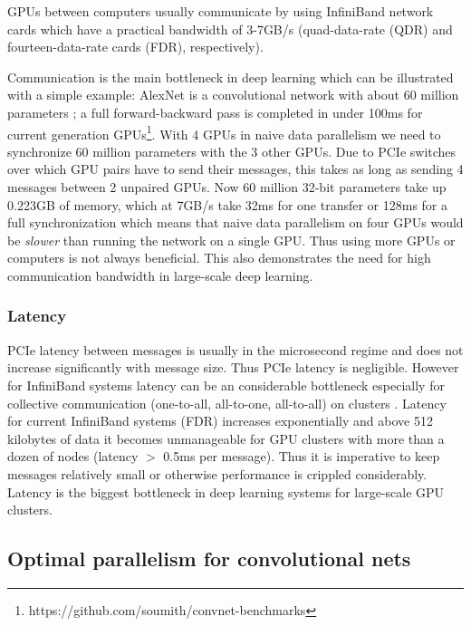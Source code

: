 \documentclass{article} %
\begin{document}
GPUs between computers usually communicate by using InfiniBand network cards which have a practical bandwidth of 3-7GB/s (quad-data-rate (QDR) and fourteen-data-rate cards (FDR), respectively).


Communication is the main bottleneck in deep learning which can be illustrated with a simple example: AlexNet is a convolutional network with about 60 million parameters \citep{krizhevsky2012imagenet}; a full forward-backward pass is completed in under 100ms for current generation GPUs\footnote{https://github.com/soumith/convnet-benchmarks}. With 4 GPUs in naive data parallelism we need to synchronize 60 million parameters with the 3 other GPUs. Due to PCIe switches over which GPU pairs have to send their messages, this takes as long as sending 4 messages between 2 unpaired GPUs. Now 60 million 32-bit parameters take up 0.223GB of memory, which at 7GB/s take 32ms for one transfer or 128ms for a full synchronization which means that naive data parallelism on four GPUs would be {\it slower} than running the network on a single GPU. Thus using more GPUs or computers is not always beneficial. This also demonstrates the need for high communication bandwidth in large-scale deep learning.

\subsubsection{Latency}

PCIe latency between messages is usually in the microsecond regime and does not increase significantly with message size. Thus PCIe latency is negligible. However for InfiniBand systems latency can be an considerable bottleneck especially for collective communication (one-to-all, all-to-one, all-to-all) on clusters \citep{sur2005high, singh2012optimizing}. Latency for current InfiniBand systems (FDR) increases exponentially and above 512 kilobytes of data it becomes unmanageable for GPU clusters with more than a dozen of nodes (latency $>$ 0.5ms per message). Thus it is imperative to keep messages relatively small or otherwise performance is crippled considerably. Latency is the biggest bottleneck in deep learning systems for large-scale GPU clusters.

\subsection{Optimal parallelism for convolutional nets}
\end{document}
